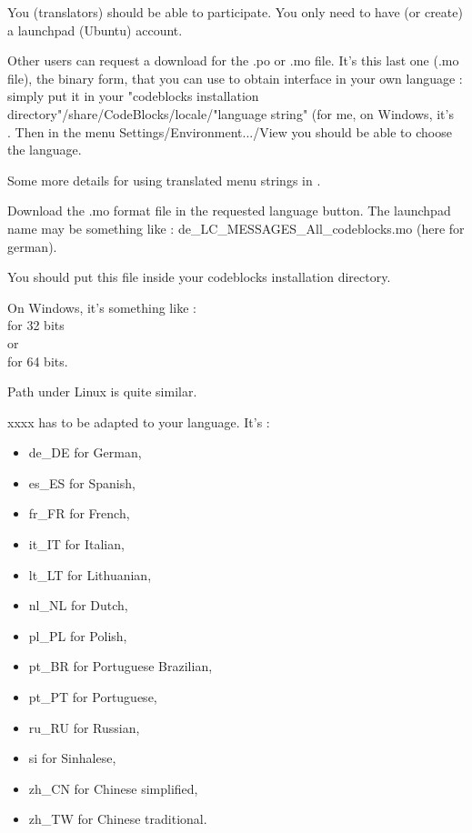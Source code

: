 You (translators) should be able to participate. You only need to have (or create) a launchpad (Ubuntu) account.

Other users can request a download for the .po or .mo file. It's this last one (.mo file), the binary form, that you can use to obtain \codeblocks interface in your own language : simply put it in your "codeblocks installation directory"/share/CodeBlocks/locale/"language string" (for me, on Windows, it's\\ . Then in the menu Settings/Environment.../View you should be able to choose the language.

Some more details for using translated menu strings in \codeblocks.

Download the .mo format file in the requested language button. The launchpad name may be something like : de\_LC\_MESSAGES\_All\_codeblocks.mo (here for german).

You should put this file inside your codeblocks installation directory.

On Windows, it's something like :\\
 for 32 bits\\
 or\\
 for 64 bits.

Path under Linux is quite similar.

xxxx has to be adapted to your language. It's :
\begin{itemize}
\item de\_DE for German,
\item es\_ES for Spanish,
\item fr\_FR for French,
\item it\_IT for Italian,
\item lt\_LT for Lithuanian,
\item nl\_NL for Dutch,
\item pl\_PL for Polish,
\item pt\_BR for Portuguese Brazilian,
\item pt\_PT for Portuguese,
\item ru\_RU for Russian,
\item si     for Sinhalese,
\item zh\_CN for Chinese simplified,
\item zh\_TW for Chinese traditional.
\end{itemize}

